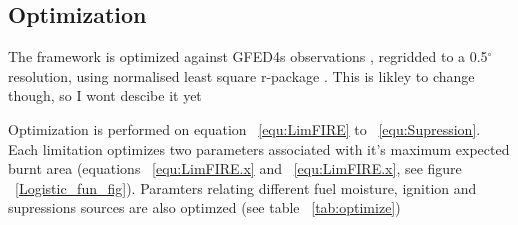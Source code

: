 \subsection{Optimization}

\begin{shaded}
The framework is optimized against GFED4s observations \citep{Giglio2013}, regridded to a 0.5$^{\circ}$ resolution, using normalised least square r-package \citep{rstats}. This is likley to change though, so I wont descibe it yet
\end{shaded}

Optimization is performed on equation ~\ref{equ:LimFIRE} to ~\ref{equ:Supression}. Each limitation optimizes two parameters associated with it's maximum expected burnt area (equations ~\ref{equ:LimFIRE.x} and ~\ref{equ:LimFIRE.x}, see figure ~\ref{Logistic_fun_fig}). Paramters relating different fuel moisture, ignition and supressions sources are also optimzed (see table ~\ref{tab:optimize})

